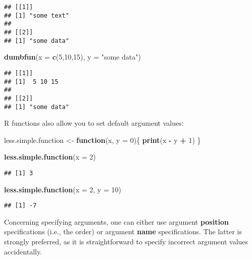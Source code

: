 \documentclass[
]{book}
\newenvironment{Shaded}{\begin{snugshade}}{\end{snugshade}}
\newcommand{\ControlFlowTok}[1]{\textcolor[rgb]{0.13,0.29,0.53}{\textbf{#1}}}
\newcommand{\DataTypeTok}[1]{\textcolor[rgb]{0.13,0.29,0.53}{#1}}
\newcommand{\DecValTok}[1]{\textcolor[rgb]{0.00,0.00,0.81}{#1}}
\newcommand{\KeywordTok}[1]{\textcolor[rgb]{0.13,0.29,0.53}{\textbf{#1}}}
\newcommand{\NormalTok}[1]{#1}
\newcommand{\OperatorTok}[1]{\textcolor[rgb]{0.81,0.36,0.00}{\textbf{#1}}}
\newcommand{\StringTok}[1]{\textcolor[rgb]{0.31,0.60,0.02}{#1}}
\begin{document}
\begin{verbatim}
## [[1]]
## [1] "some text"
## 
## [[2]]
## [1] "some data"
\end{verbatim}

\begin{Shaded}
\begin{Highlighting}[]
\KeywordTok{dumbfun}\NormalTok{(}\DataTypeTok{x =} \KeywordTok{c}\NormalTok{(}\DecValTok{5}\NormalTok{,}\DecValTok{10}\NormalTok{,}\DecValTok{15}\NormalTok{), }\DataTypeTok{y =} \StringTok{"some data"}\NormalTok{)}
\end{Highlighting}
\end{Shaded}

\begin{verbatim}
## [[1]]
## [1]  5 10 15
## 
## [[2]]
## [1] "some data"
\end{verbatim}

R functions also allow you to set default argument values:

\begin{Shaded}
\begin{Highlighting}[]
\NormalTok{less.simple.function \textless{}{-}}\StringTok{ }\ControlFlowTok{function}\NormalTok{(x, }\DataTypeTok{y =} \DecValTok{0}\NormalTok{)\{}
  \KeywordTok{print}\NormalTok{(x }\OperatorTok{{-}}\StringTok{ }\NormalTok{y }\OperatorTok{+}\StringTok{ }\DecValTok{1}\NormalTok{)}
\NormalTok{\}}

\KeywordTok{less.simple.function}\NormalTok{(}\DataTypeTok{x =} \DecValTok{2}\NormalTok{)}
\end{Highlighting}
\end{Shaded}

\begin{verbatim}
## [1] 3
\end{verbatim}

\begin{Shaded}
\begin{Highlighting}[]
\KeywordTok{less.simple.function}\NormalTok{(}\DataTypeTok{x =} \DecValTok{2}\NormalTok{, }\DataTypeTok{y =} \DecValTok{10}\NormalTok{)}
\end{Highlighting}
\end{Shaded}

\begin{verbatim}
## [1] -7
\end{verbatim}

Concerning specifying arguments, one can either use argument \textbf{position} specifications (i.e., the order) or argument \textbf{name} specifications. The latter is strongly preferred, as it is straightforward to specify incorrect argument values accidentally.
\end{document}
